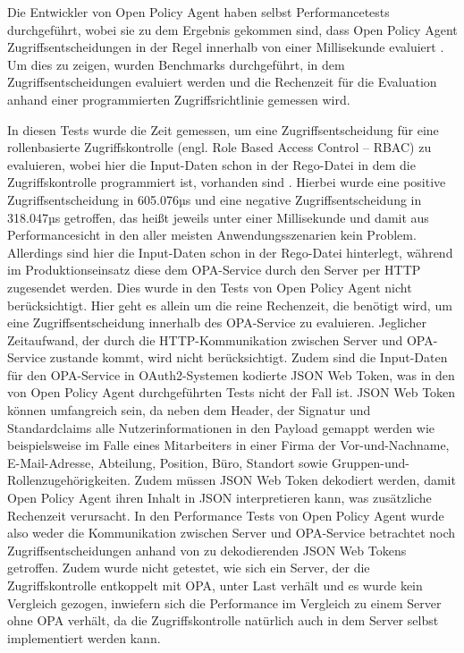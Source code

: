 Die Entwickler von Open Policy Agent haben selbst Performancetests durchgeführt, wobei sie zu dem Ergebnis gekommen sind, dass Open Policy Agent Zugriffsentscheidungen in der Regel innerhalb von einer Millisekunde evaluiert \citep{opaperformance:2021:07}. Um dies zu zeigen, wurden Benchmarks durchgeführt, in dem Zugriffsentscheidungen evaluiert werden und die Rechenzeit für die Evaluation anhand einer programmierten Zugriffsrichtlinie gemessen wird.\smallskip

In diesen Tests wurde die Zeit gemessen, um eine Zugriffsentscheidung für eine rollenbasierte Zugriffskontrolle (engl. Role Based Access Control – RBAC) zu evaluieren, wobei hier die Input-Daten schon in der Rego-Datei in dem die Zugriffskontrolle programmiert ist, vorhanden sind \citep{oparbacperformance:2021}. Hierbei wurde eine positive Zugriffsentscheidung in 605.076µs und eine negative Zugriffsentscheidung in 318.047µs getroffen, das heißt jeweils unter einer Millisekunde und damit aus Performancesicht in den aller meisten Anwendungsszenarien kein Problem. 
Allerdings sind hier die Input-Daten schon in der Rego-Datei hinterlegt, während im Produktionseinsatz diese dem OPA-Service durch den Server per HTTP zugesendet werden. Dies wurde in den Tests von Open Policy Agent nicht berücksichtigt. Hier geht es allein um die reine Rechenzeit, die benötigt wird, um eine Zugriffsentscheidung innerhalb des OPA-Service zu evaluieren. Jeglicher Zeitaufwand, der durch die HTTP-Kommunikation zwischen Server und OPA-Service zustande kommt, wird nicht berücksichtigt. 
Zudem sind die Input-Daten für den OPA-Service in OAuth2-Systemen kodierte JSON Web Token, was in den von Open Policy Agent durchgeführten Tests nicht der Fall ist. JSON Web Token können umfangreich sein, da neben dem Header, der Signatur und Standardclaims alle Nutzerinformationen in den Payload gemappt werden wie beispielsweise im Falle eines Mitarbeiters in einer Firma der Vor-und-Nachname, E-Mail-Adresse, Abteilung, Position, Büro, Standort sowie Gruppen-und-Rollenzugehörigkeiten. Zudem müssen JSON Web Token dekodiert werden, damit Open Policy Agent ihren Inhalt in JSON interpretieren kann, was zusätzliche Rechenzeit verursacht. 
In den Performance Tests von Open Policy Agent wurde also weder die Kommunikation zwischen Server und OPA-Service betrachtet noch Zugriffsentscheidungen anhand von zu dekodierenden JSON Web Tokens getroffen. Zudem wurde nicht getestet, wie sich ein Server, der die Zugriffskontrolle entkoppelt mit OPA, unter Last verhält und es wurde kein Vergleich gezogen, inwiefern sich die Performance im Vergleich zu einem Server ohne OPA verhält, da die Zugriffskontrolle natürlich auch in dem Server selbst implementiert werden kann. 
